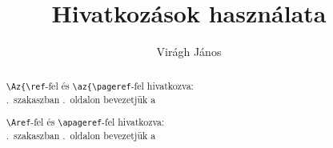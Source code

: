\documentclass{article}
\title{Hivatkozások használata}
\author{Virágh János}
\begin{document}
\maketitle

\begin{abstract}
\verb!\Az{\ref!-fel és \verb!\az{\pageref!-fel hivatkozva:\\ \Az{\ref{sec-something}}.~szakaszban \az{\pageref{sec-something}}.~oldalon bevezetjük a \textellipsis

\verb!\Aref!-fel és \verb!\apageref!-fel hivatkozva:\\ .~szakaszban .~oldalon bevezetjük a \textellipsis
\end{abstract}

\tableofcontents
\listoffigures
\end{document}

